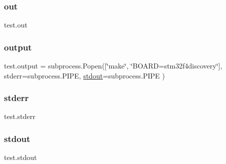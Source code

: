 \subsubsection{\texorpdfstring{out}{out}}
{\footnotesize\ttfamily test.\+out}

\mbox{\label{namespacetest_a07b64f21658cf1faa97a31563ac979d2}} 
\subsubsection{\texorpdfstring{output}{output}}
{\footnotesize\ttfamily test.\+output = subprocess.\+Popen(\mbox{[}\char`\"{}make\char`\"{}, \char`\"{}B\+O\+A\+RD=stm32f4discovery\char`\"{}\mbox{]}, stderr=subprocess.\+P\+I\+PE, \hyperlink{namespacetest_a6a4f0f87a5461eec246e70e9213db991}{stdout}=subprocess.\+P\+I\+PE )}

\mbox{\label{namespacetest_ab481765e85c55d40700cce953bc42f17}} 
\subsubsection{\texorpdfstring{stderr}{stderr}}
{\footnotesize\ttfamily test.\+stderr}

\mbox{\label{namespacetest_a6a4f0f87a5461eec246e70e9213db991}} 
\subsubsection{\texorpdfstring{stdout}{stdout}}
{\footnotesize\ttfamily test.\+stdout}

